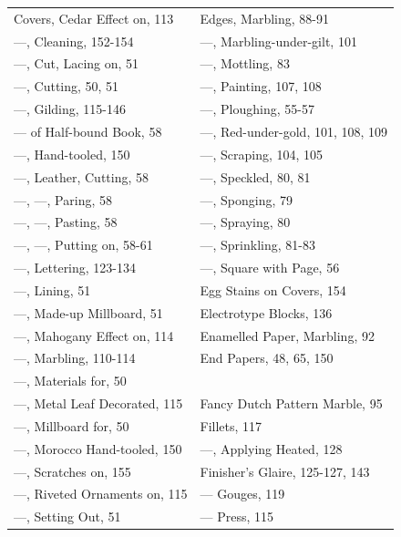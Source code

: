 \documentclass[twoside]{book}
\begin{document}
\begin{center}
\begin{tiny}
\begin{tabular}{l|l}
Covers, Cedar Effect on, 113     & Edges, Marbling, 88-91               \\
---, Cleaning, 152-154           & ---, Marbling-under-gilt, 101        \\
---, Cut, Lacing on, 51          & ---, Mottling, 83                    \\
---, Cutting, 50, 51             & ---, Painting, 107, 108              \\
---, Gilding, 115-146            & ---, Ploughing, 55-57                \\
--- of Half-bound Book, 58       & ---, Red-under-gold, 101, 108, 109   \\
---, Hand-tooled, 150            & ---, Scraping, 104, 105              \\
---, Leather, Cutting, 58        & ---, Speckled, 80, 81                \\
---, ---, Paring, 58             & ---, Sponging, 79                    \\
---, ---, Pasting, 58            & ---, Spraying, 80                    \\
---, ---, Putting on, 58-61      & ---, Sprinkling, 81-83               \\
---, Lettering, 123-134          & ---, Square with Page, 56            \\
---, Lining, 51                  & Egg Stains on Covers, 154            \\
---, Made-up Millboard, 51       & Electrotype Blocks, 136              \\
---, Mahogany Effect on, 114     & Enamelled Paper, Marbling, 92        \\
---, Marbling, 110-114           & End Papers, 48, 65, 150              \\
---, Materials for, 50           &                                      \\
---, Metal Leaf Decorated, 115   & Fancy Dutch Pattern Marble, 95       \\
---, Millboard for, 50           & Fillets, 117                         \\
---, Morocco Hand-tooled, 150    & ---, Applying Heated, 128            \\
---, Scratches on, 155           & Finisher's Glaire, 125-127, 143      \\
---, Riveted Ornaments on, 115   & --- Gouges, 119                      \\
---, Setting Out, 51             & --- Press, 115                       \\

\end{tabular}
\end{tiny}
\end{center}
\end{document}
